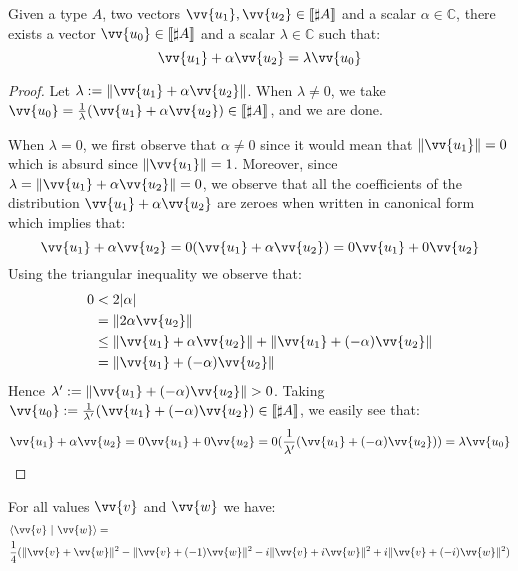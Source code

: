 \documentclass[runningheads,orivec,envcountsame,envcountsect]{llncs}
\def\C{\mathbb{C}}            %
\def\scal#1#2{\langle{#1}~|~{#2}\rangle}
\def\sem#1{\llbracket#1\rrbracket}
\begin{document}
\begin{lemma}\label{lem:VecRewrite}%
Given a type $A$, two vectors $\vv{u_1},\vv{u_2}\in\sem{\sharp A}$ and a scalar $\alpha\in\C$, there exists a vector $\vv{u_0}\in\sem{\sharp A}$ and a scalar $\lambda\in\C$ such that:
\[
\vv{u_1} + \alpha\vv{u_2} = \lambda \vv{u_0} 
\]
\end{lemma}
\begin{proof}
    Let $\lambda:=\|\vv{u_1}+\alpha\vv{u_2}\|$. When $\lambda\neq 0$, we take $\vv{u_0}=\frac{1}{\lambda}(\vv{u_1}+\alpha\vv{u_2})\in\sem{\sharp A}$, and we are done.

    When $\lambda=0$, we first observe that $\alpha\neq 0$ since it would mean that $\|\vv{u_1}\|=0$ which is absurd since $\|\vv{u_1}\|=1$. Moreover, since $\lambda=\|\vv{u_1}+\alpha\vv{u_2}\|=0$, we observe that all the coefficients of the distribution $\vv{u_1}+\alpha\vv{u_2}$ are zeroes when written in canonical form which implies that:
    \[
    \vv{u_1}+\alpha\vv{u_2} = 0(\vv{u_1}+\alpha\vv{u_2}) = 0\vv{u_1}+0\vv{u_2}
    \]
    Using the triangular inequality we observe that:
    \begin{align*}
    0 &< 2|\alpha|\\
    &= \|2\alpha\vv{u_2}\|\\
    &\leq\|\vv{u_1}+\alpha\vv{u_2}\| + \|\vv{u_1 }+ (-\alpha)\vv{u_2}\|\\
    &= \|\vv{u_1}+(-\alpha)\vv{u_2}\|
    \end{align*}
    Hence $\lambda' := \|\vv{u_1}+(-\alpha)\vv{u_2}\|>0$. Taking $\vv{u_0}:= \frac{1}{\lambda'}(\vv{u_1}+ (-\alpha)\vv{u_2})\in\sem{\sharp A}$, we easily see that:
    \[
    \vv{u_1}+\alpha\vv{u_2} = 0\vv{u_1} + 0\vv{u_2} = 0(\frac{1}{\lambda'} (\vv{u_1} + (-\alpha) \vv{u_2})) = \lambda \vv{u_0}
    \]
\end{proof}

\begin{theorem}\label{prop:Polarization} %
For all values $\vv{v}$ and $\vv{w}$ we have:
\begin{align*}
&\scal{\vv{v}}{\vv{w}}=\\
&\frac{1}{4} (\|\vv{v}+\vv{w}\|^2 - \|\vv{v} + (-1) \vv{w}\|^2 - i\|\vv{v} + i\vv{w}\|^2 + i\|\vv{v}+ (-i)\vv{w}\|^2)
\end{align*}
\end{theorem}
\end{document}
